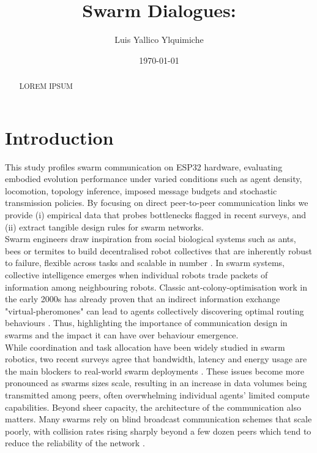 \documentclass[conference]{IEEEtran}
\title{Swarm Dialogues: 
}
\author{Luis Yallico Ylquimiche}
\date{\today}
\begin{document}
\maketitle
\pagestyle{plain}

\begin{abstract}
LOREM IPSUM
\end{abstract}


\section{Introduction}

This study profiles swarm communication on ESP32 hardware, evaluating embodied evolution performance under varied conditions such as agent density, locomotion, topology inference, imposed message budgets and stochastic transmission policies. By focusing on direct peer-to-peer communication links we provide (i) empirical data that probes bottlenecks flagged in recent surveys, and (ii) extract tangible design rules for swarm networks.\\

Swarm engineers draw inspiration from social biological systems such as ants, bees or termites to build decentralised robot collectives that are inherently robust to failure, flexible across tasks and scalable in number \cite{hamann_swarm_2018}. In swarm systems, collective intelligence emerges when individual robots trade packets of information among neighbouring robots. Classic ant-colony-optimisation work in the early 2000s has already proven that an indirect information exchange "virtual-pheromones" can lead to agents collectively discovering optimal routing behaviours \cite{dorigo_ant_2000}. Thus, highlighting the importance of communication design in swarms and the impact it can have over behaviour emergence.\\

While coordination and task allocation have been widely studied in swarm robotics, two recent surveys agree that bandwidth, latency and energy usage are the main blockers to real-world swarm deployments \cite{ding_advancements_2023}\cite{an_multi-robot_2023}. These issues become more pronounced as swarms sizes scale, resulting in an increase in data volumes being transmitted among peers, often overwhelming individual agents' limited compute capabilities. Beyond sheer capacity, the architecture of the communication also matters. Many swarms rely on blind broadcast communication schemes that scale poorly, with collision rates rising sharply beyond a few dozen peers which tend to reduce the reliability of the network \cite{an_multi-robot_2023}.\\
\end{document}
